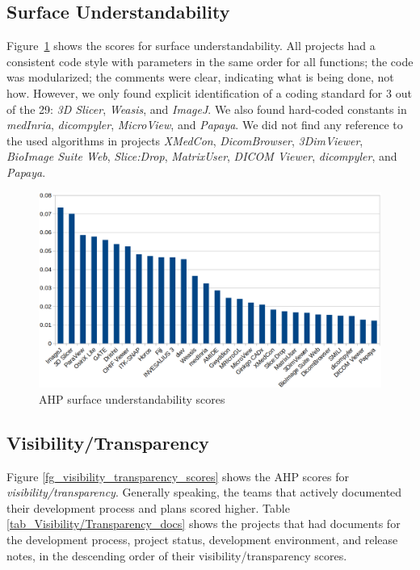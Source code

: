 \documentclass[final, 3p, times, authoryear]{elsarticle}
\begin{document}
\subsection{Surface Understandability} \label{sec_result_understandability}

Figure~\ref{fg_surface_understandability_scores} shows the scores for surface
understandability. All projects had a consistent code style with parameters in
the same order for all functions; the code was modularized; the comments were
clear, indicating what is being done, not how. However, we only found explicit
identification of a coding standard for 3 out of the 29: \textit{3D Slicer},
\textit{Weasis}, and \textit{ImageJ}. We also found hard-coded constants in
\textit{medInria}, \textit{dicompyler}, \textit{MicroView}, and \textit{Papaya}.
We did not find any reference to the used algorithms in projects
\textit{XMedCon}, \textit{DicomBrowser}, \textit{3DimViewer}, \textit{BioImage
Suite Web}, \textit{Slice:Drop}, \textit{MatrixUser}, \textit{DICOM Viewer},
\textit{dicompyler}, and \textit{Papaya}. 

\begin{figure}[ht]
\includegraphics[scale=0.38]{figures/understandability_scores.png}
\caption{AHP surface understandability scores}
\label{fg_surface_understandability_scores}
\end{figure}

\subsection{Visibility/Transparency} \label{sec_result_visibility_transparency}

Figure \ref{fg_visibility_transparency_scores} shows the AHP scores for
\textit{visibility/transparency}. Generally speaking, the teams that actively
documented their development process and plans scored higher. Table
\ref{tab_Visibility/Transparency_docs} shows the projects that had documents for
the development process, project status, development environment, and release
notes, in the descending order of their visibility/transparency scores.
\end{document}
